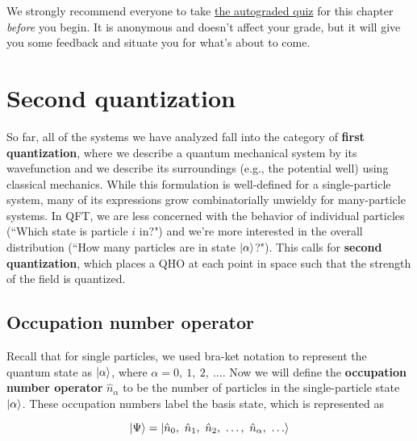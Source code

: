 \begin{tcolorbox}[colframe=PaloAlto, colbacktitle=PaloAlto!20!white, title=Pre-check quiz]
	We strongly recommend everyone to take \href{TODO}{the autograded quiz} for this chapter \emph{before} you begin.
	It is anonymous and doesn't affect your grade, but it will give you some feedback and situate you for what's about to come.
\end{tcolorbox}


\section{Second quantization}

So far, all of the systems we have analyzed fall into the category of \textbf{first quantization}, where we describe a quantum mechanical system by its wavefunction and we describe its surroundings (e.g., the potential well) using classical mechanics. 
While this formulation is well-defined for a single-particle system, many of its expressions grow combinatorially unwieldy for many-particle systems. 
In QFT, we are less concerned with the behavior of individual particles (``Which state is particle $i$ in?") and we're more interested in the overall distribution (``How many particles are in state $\ket{\alpha}$?"). 
This calls for \textbf{second quantization}, which places a QHO at each point in space such that the strength of the field is quantized. 


\subsection{Occupation number operator}

Recall that for single particles, we used bra-ket notation to represent the quantum state as $\ket{\alpha}$, where $\alpha = 0,\ 1,\ 2,\ \dots$. 
Now we will define the \textbf{occupation number operator} $\hat{n}_{\alpha}$ to be the number of particles in the single-particle state $\ket{\alpha}$. 
These occupation numbers label the basis state, which is represented as

\begin{tcolorbox} [title=Basis vector] \vspace{-2ex}
	\begin{equation}
		\ket{\Psi} = \ket{\hat{n}_0,\ \hat{n}_1,\ \hat{n}_2,\ \dots,\ \hat{n}_{\alpha},\ \dots} \label{eq:fock}
	\end{equation}
\end{tcolorbox} 

